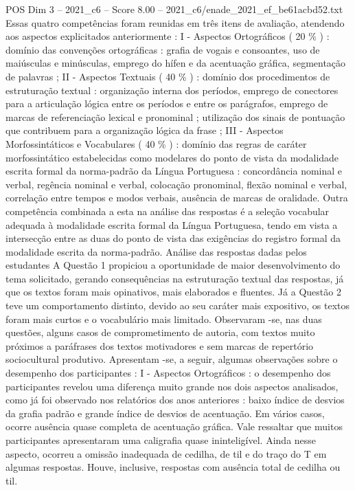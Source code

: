 \begin{textsample}{POS Dim 3 – 2021\_c6 – Score 8.00 – 2021\_c6/enade\_2021\_ef\_be61acbd52.txt}
Essas quatro competências foram reunidas em três itens de avaliação, atendendo aos aspectos explicitados anteriormente : I - Aspectos Ortográficos ( 20 \% ) : domínio das convenções ortográficas : grafia de vogais e consoantes, uso de maiúsculas e minúsculas, emprego do hífen e da acentuação gráfica, segmentação de palavras ; II - Aspectos Textuais ( 40 \% ) : domínio dos procedimentos de estruturação textual : organização interna dos períodos, emprego de conectores para a articulação lógica entre os períodos e entre os parágrafos, emprego de marcas de referenciação lexical e pronominal ; utilização dos sinais de pontuação que contribuem para a organização lógica da frase ; III - Aspectos Morfossintáticos e Vocabulares ( 40 \% ) : domínio das regras de caráter morfossintático estabelecidas como modelares do ponto de vista da modalidade escrita formal da norma-padrão da Língua Portuguesa : concordância nominal e verbal, regência nominal e verbal, colocação pronominal, flexão nominal e verbal, correlação entre tempos e modos verbais, ausência de marcas de oralidade.
Outra competência combinada a esta na análise das respostas é a seleção vocabular adequada à modalidade escrita formal da Língua Portuguesa, tendo em vista a intersecção entre as duas do ponto de vista das exigências do registro formal da modalidade escrita da norma-padrão.
Análise das respostas dadas pelos estudantes A Questão 1 propiciou a oportunidade de maior desenvolvimento do tema solicitado, gerando consequências na estruturação textual das respostas, já que os textos foram mais opinativos, mais elaborados e fluentes.
Já a Questão 2 teve um comportamento distinto, devido ao seu caráter mais expositivo, os textos foram mais curtos e o vocabulário mais limitado.
Observaram -se, nas duas questões, alguns casos de comprometimento de autoria, com textos muito próximos a paráfrases dos textos motivadores e sem marcas de repertório sociocultural produtivo.
Apresentam -se, a seguir, algumas observações sobre o desempenho dos participantes : I - Aspectos Ortográficos : o desempenho dos participantes revelou uma diferença muito grande nos dois aspectos analisados, como já foi observado nos relatórios dos anos anteriores : baixo índice de desvios da grafia padrão e grande índice de desvios de acentuação.
Em vários casos, ocorre ausência quase completa de acentuação gráfica.
Vale ressaltar que muitos participantes apresentaram uma caligrafia quase ininteligível.
Ainda nesse aspecto, ocorreu a omissão inadequada de cedilha, de til e do traço do T em algumas respostas.
Houve, inclusive, respostas com ausência total de cedilha ou til.

\end{textsample}
